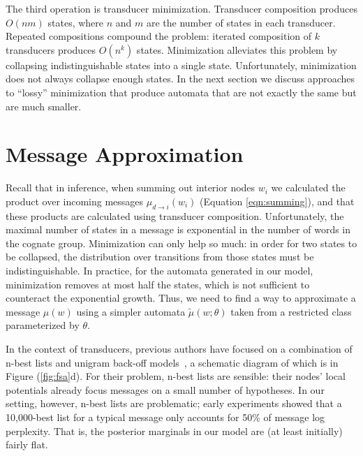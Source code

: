 \documentclass[11pt,a4paper]{article}
\begin{document}
The third operation is transducer minimization. Transducer composition
produces $O(nm)$ states, where $n$ and $m$ are the number of states
in each transducer. Repeated compositions compound the problem:
iterated composition of $k$ transducers produces $O(n^k)$ states.
Minimization alleviates this problem by collapsing indistinguishable
states into a single state. Unfortunately, minimization does not
always collapse enough states. In the next section we discuss approaches
to ``lossy'' minimization that produce automata that are not exactly
the same but are much smaller.

\section{Message Approximation}
\label{sec:approx}

Recall that in inference, when summing out interior nodes $w_i$ we
calculated the product over incoming messages $\mu_{d\to i}(w_i)$
(Equation \ref{eqn:summing}), and that these products are calculated
using transducer composition. Unfortunately, the maximal number of
states in a message is exponential in the number of words in the
cognate group. Minimization can only help so much: in order for two
states to be collapsed, the distribution over transitions from those
states must be indistinguishable. In practice, for the automata
generated in our model, minimization removes at most half the states,
which is not sufficient to counteract the exponential growth. Thus,
we need to find a way to approximate a message $\mu(w)$ using a
simpler automata $\tilde\mu(w;\theta)$ taken from a restricted class
parameterized by $\theta$.

In the context of transducers, previous authors have focused on a
combination of n-best lists and unigram back-off
models~\cite{dreyer2009graphical}, a schematic diagram of which is
in Figure (\ref{fig:fsa}d). For their problem, n-best lists are
sensible: their nodes' local potentials already focus messages on
a small number of hypotheses.  In our setting, however, n-best lists
are problematic; early experiments showed that a 10,000-best list
for a typical message only accounts for 50\% of message log perplexity.
That is, the posterior marginals in our model are (at least initially)
fairly flat.
\end{document}
